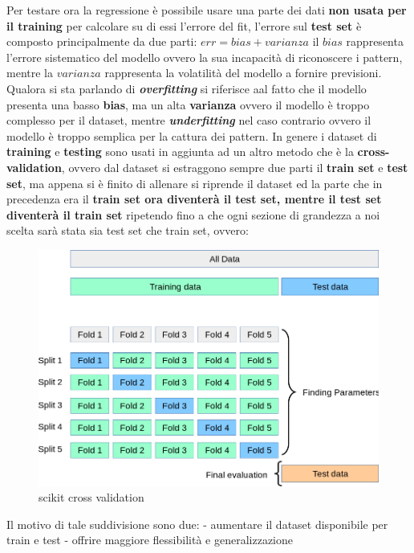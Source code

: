 \documentclass[11pt]{article}
\begin{document}
Per testare ora la regressione è possibile usare una parte dei dati
\textbf{non usata per il training} per calcolare su di essi l'errore del
fit, l'errore sul \textbf{test set} è composto principalmente da due
parti: \(err = bias + varianza\) il \(bias\) rappresenta l'errore
sistematico del modello ovvero la sua incapacità di riconoscere i
pattern, mentre la \(varianza\) rappresenta la volatilità del modello a
fornire previsioni. Qualora si sta parlando di
\textbf{\emph{overfitting}} si riferisce aal fatto che il modello
presenta una basso \textbf{bias}, ma un alta \textbf{varianza} ovvero il
modello è troppo complesso per il dataset, mentre
\textbf{\emph{underfitting}} nel caso contrario ovvero il modello è
troppo semplica per la cattura dei pattern. In genere i dataset di
\textbf{training} e \textbf{testing} sono usati in aggiunta ad un altro
metodo che è la \textbf{cross-validation}, ovvero dal dataset si
estraggono sempre due parti il \textbf{train set} e \textbf{test set},
ma appena si è finito di allenare si riprende il dataset ed la parte che
in precedenza era il \textbf{train set ora diventerà il test set, mentre
il test set diventerà il train set} ripetendo fino a che ogni sezione di
grandezza a noi scelta sarà stata sia test set che train set, ovvero:

\begin{figure}
\centering
\includegraphics{../img/cross_validation.png}
\caption{scikit cross validation}
\end{figure}

Il motivo di tale suddivisione sono due: - aumentare il dataset
disponibile per train e test - offrire maggiore flessibilità e
generalizzazione
\end{document}
